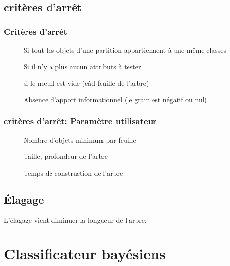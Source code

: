 \section{critères d'arrêt}

\subsection{Critères d'arrêt}
\begin{description}
\item[] Si tout les objets d'une partition appartiennent à une même classes
\item[] Si il n'y a plus aucun attributs à tester
\item[] si le nœud est vide (càd feuille de l'arbre)
\item[] Absence d'apport informationnel (le grain est négatif ou nul)
\end{description}

\subsection{critères d'arrêt: Paramètre utilisateur}
\begin{description}
\item[] Nombre d'objets minimum par feuille
\item[] Taille, profondeur de l'arbre
\item[] Temps de construction de l'arbre
\end{description}

\section{Élagage}
L'élagage vient diminuer la longueur de l'arbre:\\

\pagebreak
\chapter{Classificateur bayésiens}




\pagebreak